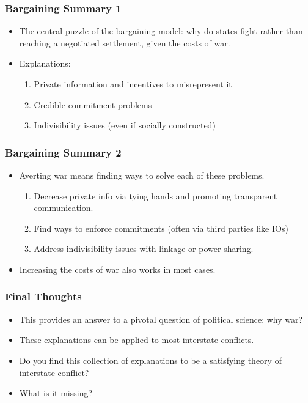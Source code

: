 \documentclass[handout]{beamer}
\begin{document}
\begin{frame} 
	\frametitle{\LARGE{Bargaining Summary 1}}
	\begin{itemize}
		\item The central puzzle of the bargaining model: why do states fight rather than reaching a negotiated settlement, given the costs of war. \pause 
		\item Explanations:
		\begin{enumerate}
			\item Private information and incentives to misrepresent it \pause
			\item Credible commitment problems \pause
			\item Indivisibility issues (even if socially constructed) 
		\end{enumerate}
	\end{itemize}
\end{frame}

\begin{frame} 
	\frametitle{\LARGE{Bargaining Summary 2}}
	\begin{itemize}
		\item Averting war means finding ways to solve each of these problems. 
		\begin{enumerate}
			\item Decrease private info via tying hands and promoting transparent communication. \pause
			\item Find ways to enforce commitments (often via third parties like IOs) \pause
			\item Address indivisibility issues with linkage or power sharing. \pause
		\end{enumerate}
		\item Increasing the costs of war also works in most cases.
	\end{itemize}
\end{frame}

\begin{frame} 
	\frametitle{\LARGE{Final Thoughts}}
	\begin{itemize}
		\item This provides an answer to a pivotal question of political science: why war? \pause
		\item These explanations can be applied to most interstate conflicts. \pause
		\item Do you find this collection of explanations to be a satisfying theory of interstate conflict?
		\item What is it missing?
	\end{itemize}
\end{frame}
\end{document}
